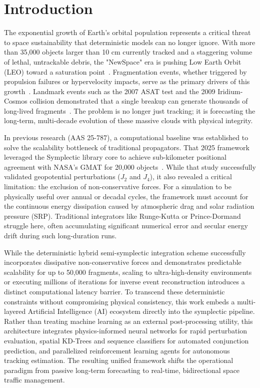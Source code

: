 \documentclass[letterpaper,11pt]{AAS}
\begin{document}
\section{Introduction}

The exponential growth of Earth’s orbital population represents a critical threat to space sustainability that deterministic models can no longer ignore. With more than 35,000 objects larger than 10 cm currently tracked and a staggering volume of lethal, untrackable debris, the "NewSpace" era is pushing Low Earth Orbit (LEO) toward a saturation point~\cite{european_space_agency_space_nodate,diserens_newspace_2020}. Fragmentation events, whether triggered by propulsion failures or hypervelocity impacts, serve as the primary drivers of this growth~\cite{kessler_collision_1978}. Landmark events such as the 2007 ASAT test and the 2009 Iridium-Cosmos collision demonstrated that a single breakup can generate thousands of long-lived fragments~\cite{wang_analysis_2010}. The problem is no longer just tracking; it is forecasting the long-term, multi-decade evolution of these massive clouds with physical integrity.

In previous research (AAS 25-787), a computational baseline was established to solve the scalability bottleneck of traditional propagators. That 2025 framework leveraged the Symplectic library core to achieve sub-kilometer positional agreement with NASA’s GMAT for 20,000 objects~\cite{noauthor_general_nodate}. While that study successfully validated geopotential perturbations ($J_2$ and $J_4$), it also revealed a critical limitation: the exclusion of non-conservative forces. For a simulation to be physically useful over annual or decadal cycles, the framework must account for the continuous energy dissipation caused by atmospheric drag and solar radiation pressure (SRP). Traditional integrators like Runge-Kutta or Prince-Dormand struggle here, often accumulating significant numerical error and secular energy drift during such long-duration runs.

While the deterministic hybrid semi-symplectic integration scheme successfully incorporates dissipative non-conservative forces and demonstrates predictable scalability for up to 50,000 fragments, scaling to ultra-high-density environments or executing millions of iterations for inverse event reconstruction introduces a distinct computational latency barrier. To transcend these deterministic constraints without compromising physical consistency, this work embeds a multi-layered Artificial Intelligence (AI) ecosystem directly into the symplectic pipeline. Rather than treating machine learning as an external post-processing utility, this architecture integrates physics-informed neural networks for rapid perturbation evaluation, spatial KD-Trees and sequence classifiers for automated conjunction prediction, and parallelized reinforcement learning agents for autonomous tracking estimation. The resulting unified framework shifts the operational paradigm from passive long-term forecasting to real-time, bidirectional space traffic management.
\end{document}
